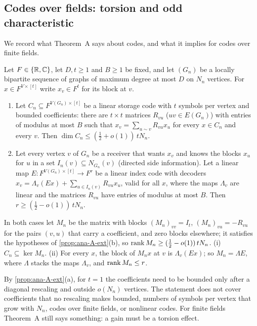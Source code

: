 \subsection{Codes over fields: torsion and odd characteristic}\label{sec:ana-fields}

We record what Theorem~A says about codes, and what it implies for codes over finite fields.

\begin{corollary}\label{cor:ana-codes}
\notformalized
Let $F\in\{\mathbb{R},\mathbb{C}\}$, let $D,t\ge1$ and $B\ge1$ be fixed, and let $(G_n)$ be a locally bipartite sequence of graphs of
maximum degree at most $D$ on $N_n$ vertices. For $x\in F^{V\times[t]}$ write $x_v\in F^t$ for its block at $v$.
\begin{enumerate}[label=(\roman*)]
\item Let $C_n\subseteq F^{V(G_n)\times[t]}$ be a linear storage code with $t$ symbols per vertex and bounded
  coefficients: there are $t\times t$ matrices $R_{vu}$ ($uv\in E(G_n)$) with entries of modulus at most $B$ such that
  $x_v=\sum_{u\sim v}R_{vu}x_u$ for every $x\in C_n$ and every $v$. Then $\dim C_n\le(\frac12+o(1))\,tN_n$.
\item Let every vertex $v$ of $G_n$ be a receiver that wants $x_v$ and knows the blocks $x_u$ for $u$ in a set
  $I_n(v)\subseteq N_{G_n}(v)$ (directed side information). Let a linear map $E\colon F^{V(G_n)\times[t]}\to F^r$ be a
  linear index code with decoders $x_v=\Lambda_v(Ex)+\sum_{u\in I_n(v)}R_{vu}x_u$, valid for all $x$, where the maps
  $\Lambda_v$ are linear and the matrices $R_{vu}$ have entries of modulus at most $B$. Then $r\ge(\frac12-o(1))\,tN_n$.
\end{enumerate}
\end{corollary}

\begin{informalproof}
In both cases let $M_n$ be the matrix with blocks $(M_n)_{vv}=I_t$, $(M_n)_{vu}=-R_{vu}$ for the pairs $(v,u)$ that carry
a coefficient, and zero blocks elsewhere; it satisfies the hypotheses of \cref{prop:ana-A-ext}(b), so
$\operatorname{rank} M_n\ge(\frac12-o(1))\,tN_n$. (i) $C_n\subseteq\ker M_n$. (ii) For every $x$, the block of $M_nx$ at $v$ is
$\Lambda_v(Ex)$; so $M_n=\Lambda E$, where $\Lambda$ stacks the maps $\Lambda_v$, and $\operatorname{rank} M_n\le r$.
\end{informalproof}

By \cref{prop:ana-A-ext}(a), for $t=1$ the coefficients need to be bounded only after a diagonal rescaling and outside
$o(N_n)$ vertices. The statement does not cover coefficients that no rescaling makes bounded, numbers of symbols per
vertex that grow with $N_n$, codes over finite fields, or nonlinear codes. For finite fields Theorem~A still says
something: a gain must be a torsion effect.

